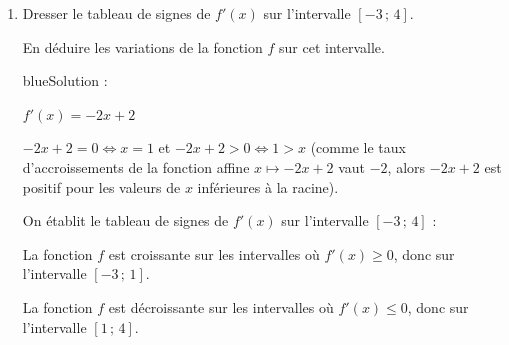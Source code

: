 \begin{enumerate}[start=5]
\begin{enumerate}[label=\alph*)]
\item Dresser le tableau de signes de $f'(x)$ sur l'intervalle $[-3\,;\,4]$.\par En déduire les variations de la fonction $f$ sur cet intervalle.

\begin{color}{blue}Solution :\par

$f'(x) =  -2x+2 $ 

$-2x+2 = 0 \iff x = 1$ et $-2x+2 > 0 \iff 1 > x$ (comme le taux d'accroissements de la fonction affine $x\longmapsto -2x+2 $ vaut $-2$, alors $-2x+2$ est positif pour les valeurs de $x$ inférieures à la racine).

On établit le tableau de signes de $f'(x)$ sur l'intervalle $[-3\,;\,4]$ :


La fonction $f$ est croissante sur les intervalles où $f'(x)\geqslant 0$, donc sur l'intervalle $[-3\,;\,1]$.

La fonction $f$ est décroissante sur les intervalles où $f'(x)\leqslant 0$, donc sur l'intervalle $[1\,;\,4]$.

\end{color}

\end{enumerate}
\end{enumerate}

\bigskip
